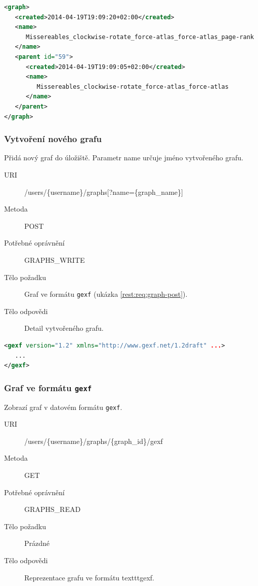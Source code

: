 \documentclass[thesis=M,czech]{FITthesis}[2014/05/6]
\begin{document}
\begin{lstlisting}[caption=Tělo odpovědi zdroje /users/\{username\}/graphs/\{graph\_id\} (GET), label=rest:resp:graph-get, language=xml]
<graph>
   <created>2014-04-19T19:09:20+02:00</created>
   <name>
      Missereables_clockwise-rotate_force-atlas_force-atlas_page-rank
   </name>
   <parent id="59">
      <created>2014-04-19T19:09:05+02:00</created>
      <name>
         Missereables_clockwise-rotate_force-atlas_force-atlas
      </name>
   </parent>
</graph>
\end{lstlisting}  

\subsubsection{Vytvoření nového grafu}
Přidá nový graf do úložiště. Parametr name určuje jméno vytvořeného grafu.
\begin{description}
  \item[URI] /users/\{username\}/graphs[?name=\{graph\_name\}]
  \item[Metoda] POST
  \item[Potřebné oprávnění] GRAPHS\_WRITE
  \item[Tělo požadku] Graf ve formátu \texttt{gexf} (ukázka \ref{rest:req:graph-post}).
  \item[Tělo odpovědi] Detail vytvořeného grafu.
\end{description}

\begin{lstlisting}[caption=Tělo požadavku zdroje /users/\{username\}/graphs (POST), label=rest:req:graph-post, language=xml]
<gexf version="1.2" xmlns="http://www.gexf.net/1.2draft" ...>
   ...
</gexf>
\end{lstlisting} 

\subsubsection{Graf ve formátu \texttt{gexf}}
Zobrazí graf v datovém formátu \texttt{gexf}.
\begin{description}
  \item[URI] /users/\{username\}/graphs/\{graph\_id\}/gexf
  \item[Metoda] GET
  \item[Potřebné oprávnění] GRAPHS\_READ
  \item[Tělo požadku] Prázdné
  \item[Tělo odpovědi] Reprezentace grafu ve formátu texttt{gexf}.
\end{description}
\end{document}
